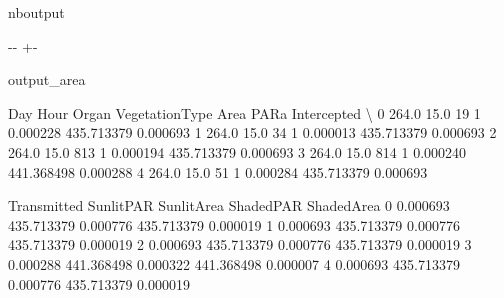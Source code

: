 \documentclass[letterpaper,10pt,english]{sphinxmanual}
\begin{document}
\begin{sphinxuseclass}{nboutput}
{

\kern-\sphinxverbatimsmallskipamount\kern-\baselineskip
\kern+\FrameHeightAdjust\kern-\fboxrule
\vspace{\nbsphinxcodecellspacing}

\begin{sphinxuseclass}{output_area}
\begin{sphinxuseclass}{}


\begin{sphinxVerbatim}[commandchars=\\\{\}]
     Day  Hour  Organ  VegetationType      Area        PARa  Intercepted  \textbackslash{}
0  264.0  15.0     19               1  0.000228  435.713379     0.000693
1  264.0  15.0     34               1  0.000013  435.713379     0.000693
2  264.0  15.0    813               1  0.000194  435.713379     0.000693
3  264.0  15.0    814               1  0.000240  441.368498     0.000288
4  264.0  15.0     51               1  0.000284  435.713379     0.000693

   Transmitted   SunlitPAR  SunlitArea   ShadedPAR  ShadedArea
0     0.000693  435.713379    0.000776  435.713379    0.000019
1     0.000693  435.713379    0.000776  435.713379    0.000019
2     0.000693  435.713379    0.000776  435.713379    0.000019
3     0.000288  441.368498    0.000322  441.368498    0.000007
4     0.000693  435.713379    0.000776  435.713379    0.000019
\end{sphinxVerbatim}



\end{sphinxuseclass}
\end{sphinxuseclass}
}

\end{sphinxuseclass}
\end{document}
